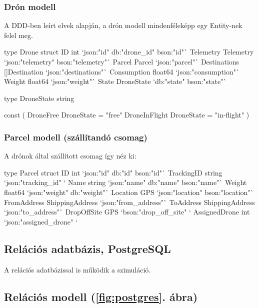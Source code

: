 \subsubsection{Drón modell}
A DDD-ben leírt elvek alapján, a drón modell mindenféleképp egy Entity-nek felel meg.
\begin{python}
    type Drone struct {
        ID           int           `json:"id" db:"drone_id" bson:"id"`
        Telemetry    Telemetry     `json:"telemetry" bson:"telemetry"`
        Parcel       Parcel        `json:"parcel"`
        Destinations []Destination `json:"destinations"`
        Consumption  float64       `json:"consumption"`
        Weight       float64       `json:"weight"`
        State        DroneState    `db:"state" bson:"state"`
    }

    type DroneState string

    const (
    DroneFree     DroneState = "free"
    DroneInFlight DroneState = "in-flight"
    )
\end{python}


\subsubsection{Parcel modell (szállítandó csomag)}
A drónok által szállított csomag így néz ki:
\begin{python}
    type Parcel struct {
        ID            int             `json:"id" db:"id" bson:"id"`
        TrackingID    string          `json:"tracking_id" `
        Name          string          `json:"name" db:"name" bson:"name"`
        Weight        float64         `json:"weight" db:"weight"`
        Location      GPS             `json:"location" bson:"location"`
        FromAddress   ShippingAddress `json:"from_address"`
        ToAddress     ShippingAddress `json:"to_address"`
        DropOffSite   GPS             `bson:"drop_off_site" `
        AssignedDrone int             `json:"assigned_drone" `
    }
\end{python}

\subsection{Relációs adatbázis, PostgreSQL}
A relációs adatbázissal is működik a szimuláció.
\subsection{Relációs modell (\ref{fig:postgres}. ábra) }

